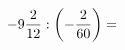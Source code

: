 \documentclass[preview]{standalone}
\begin{document}
\begin{align*}
-9 { 2 \over 12 }  :  \left( - { 2 \over 60 } \right)  =
\end{align*}
\end{document}
